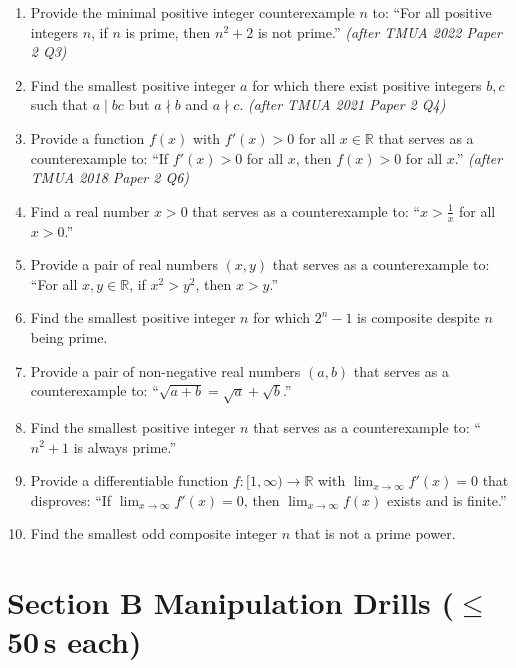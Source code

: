 \documentclass[11pt,a4paper]{article}
\begin{document}
\begin{enumerate}

\item Provide the minimal positive integer counterexample $n$ to: ``For all positive integers $n$, if $n$ is prime, then $n^2+2$ is not prime.'' \textit{\small(after TMUA 2022 Paper 2 Q3)}

\item Find the smallest positive integer $a$ for which there exist positive integers $b, c$ such that $a \mid bc$ but $a \nmid b$ and $a \nmid c$. \textit{\small(after TMUA 2021 Paper 2 Q4)}

\item Provide a function $f(x)$ with $f'(x) > 0$ for all $x \in \mathbb{R}$ that serves as a counterexample to: ``If $f'(x) > 0$ for all $x$, then $f(x) > 0$ for all $x$.'' \textit{\small(after TMUA 2018 Paper 2 Q6)}

\item Find a real number $x > 0$ that serves as a counterexample to: ``$x > \frac{1}{x}$ for all $x > 0$.''

\item Provide a pair of real numbers $(x, y)$ that serves as a counterexample to: ``For all $x, y \in \mathbb{R}$, if $x^2 > y^2$, then $x > y$.''

\item Find the smallest positive integer $n$ for which $2^n - 1$ is composite despite $n$ being prime.

\item Provide a pair of non-negative real numbers $(a, b)$ that serves as a counterexample to: ``$\sqrt{a+b} = \sqrt{a} + \sqrt{b}$.''

\item Find the smallest positive integer $n$ that serves as a counterexample to: ``$n^2 + 1$ is always prime.''

\item Provide a differentiable function $f: [1, \infty) \to \mathbb{R}$ with $\lim_{x\to\infty} f'(x) = 0$ that disproves: ``If $\lim_{x\to\infty} f'(x) = 0$, then $\lim_{x\to\infty} f(x)$ exists and is finite.''

\item Find the smallest odd composite integer $n$ that is not a prime power.

\end{enumerate}

\section*{Section B \quad Manipulation Drills \hfill{\normalfont\small($\leq$50\,s each)}}
\end{document}
